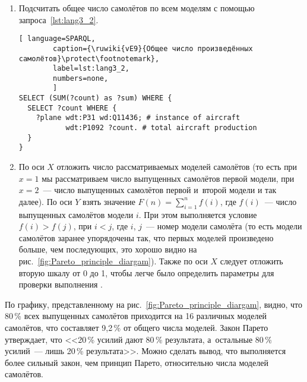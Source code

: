 
\begin{enumerate} 
  \item Подсчитать общее число самолётов по всем моделям с помощью запроса~\ref{lst:lang3_2}.
  
\begin{lstlisting}[ language=SPARQL, 
        caption={\ruwiki{vE9}{Общее число произведённых самолётов}\protect\footnotemark}, 
        label=lst:lang3_2, 
        numbers=none, 
        ]
SELECT (SUM(?count) as ?sum) WHERE {
  SELECT ?count WHERE {
    ?plane wdt:P31 wd:Q11436; # instance of aircraft
		   wdt:P1092 ?count. # total aircraft production
  }
}
\end{lstlisting}
  
  
  \item По оси $X$ отложить число рассматриваемых моделей самолётов 
      (то есть при $x = 1$ мы рассматриваем число выпущенных самолётов первой модели, 
        при $x = 2$~--- число выпущенных самолётов первой и~второй модели и так далее). 
        По оси $Y$ взять значение $F(n) = \sum\limits_{i=1}^n f(i)$, 
        где $f(i)$~--- число выпущенных самолётов модели $i$. 
        При этом выполняется условие $f(i) > f(j)$, при $i < j$, 
        где $i$, $j$~--- номер модели самолёта 
        (то есть модели самолётов заранее упорядочены так, что 
        первых моделей произведено больше, чем последующих, это хорошо видно на рис.~\ref{fig:Pareto_principle_diargam}). 
        Также по оси $X$ следует отложить вторую шкалу от 0 до 1, 
        чтобы легче было определить параметры для проверки выполнения .
\end{enumerate}

По графику, представленному на рис.~\ref{fig:Pareto_principle_diargam}, видно, 
что 80\,\% всех выпущенных самолётов приходится на 16 различных моделей самолётов, 
что составляет 9,2\,\% от общего числа моделей. 
Закон Парето утверждает, что 
<<20\,\% усилий дают 80\,\% результата, а~остальные 80\,\% усилий~--- лишь 20\,\% результата>>. 
Можно сделать вывод, что выполняется более сильный закон, чем принцип Парето, относительно числа моделей самолётов.


